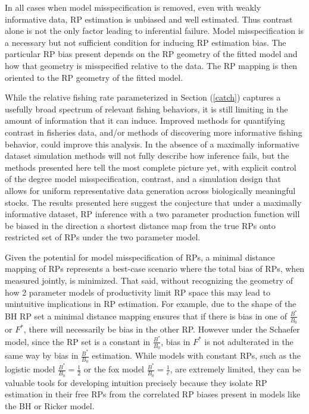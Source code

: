 \documentclass[12pt]{article}
\begin{document}
%
In all cases when model misspecification is removed, even with weakly informative 
data, RP estimation is unbiased and well estimated. Thus contrast alone is 
not the only factor leading to inferential failure. Model misspecification is a 
necessary but not sufficient condition for inducing RP estimation bias. The 
particular RP bias present depends on the RP geometry of the fitted model and 
how that geometry is misspecified relative to the data. The RP mapping is then oriented 
to the RP geometry of the fitted model. 

%
While the relative fishing rate parameterized in Section (\ref{catch}) captures a usefully 
broad spectrum of relevant fishing behaviors, it is still limiting in the amount of information 
that it can induce. Improved methods for quantifying contrast in fisheries data, and/or methods of 
discovering more informative fishing behavior, could improve this analysis. In the absence of a %
maximally informative dataset simulation methods will not fully describe how 
inference fails, but the methods presented here tell the most complete picture 
yet, with explicit control of the degree model misspecification, contrast, and 
a simulation design that allows for uniform representative data generation 
across biologically meaningful stocks. The results presented here suggest the 
conjecture that under a maximally informative dataset, RP inference with a two 
parameter production function will be biased in the direction a shortest distance 
map from the true RPs onto restricted set of RPs under the two parameter model.    

%
Given the potential for model misspecification of RPs, a minimal distance 
mapping of RPs represents a best-case scenario where the total bias of RPs, 
when measured jointly, is minimized. That said, without recognizing the 
geometry of how 2 parameter models of productivity limit RP space this may 
lead to unintuitive implications in RP estimation. For example, due to the 
shape of the BH RP set a minimal distance mapping ensures that if there is 
bias in one of $\frac{B^*}{B_0}$ or $F^*$, there will necessarily be 
bias in the other RP. However under the Schaefer model, since the RP set is a 
constant in $\frac{B^*}{B_0}$, bias in $F^*$ is not adulterated in the 
same way by bias in $\frac{B^*}{B_0}$ estimation. While models with 
constant RPs, such as the logistic model $\frac{B^*}{B_0}=\frac{1}{2}$ or 
the fox model $\frac{B^*}{B_0}=\frac{1}{e}$, are extremely limited, they 
can be valuable tools for developing intuition precisely because they isolate 
RP estimation in their free RPs from the correlated RP biases present in 
models like the BH or Ricker model. 
\end{document}

